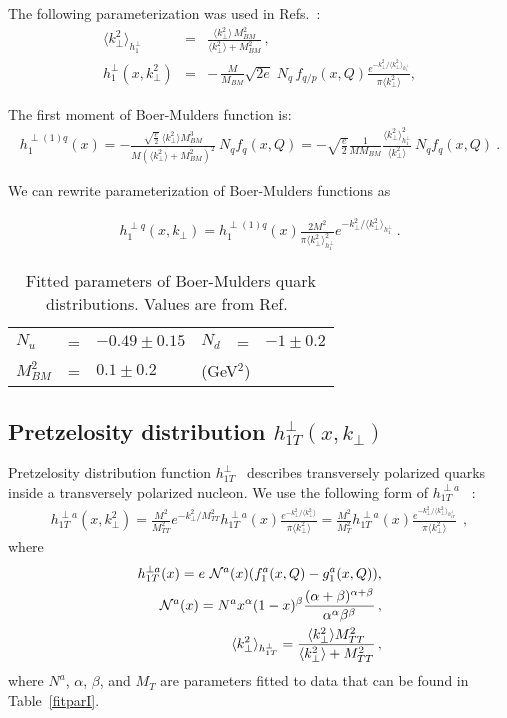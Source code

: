 \documentclass[a4paper,11pt]{article}
\newcommand{\ba}{\begin{eqnarray}}
\newcommand{\ea}{\end{eqnarray}}
\newcommand{\la}{\langle}
\newcommand{\ra}{\rangle}
\def\kperp{k_\perp}
\def\avkperp{\la \kperp^2 \ra}
\begin{document}
The following parameterization was used in Refs.~\cite{Barone:2015ksa}:
\ba
\avkperp_{h_1^\perp} &=& \frac{\avkperp \, M^2_{BM}}{\avkperp + M^2_{BM}} \, , \\
h_{1}^{\perp}(x, \kperp^2) &= &
- \,\frac{M}{M_{BM}}  
\sqrt{2e}\; N_q 
\, f_{q/p} (x, Q)\frac{e^{-\kperp^2/\avkperp_{h_{1}^{\perp}}}}{\pi\avkperp},  
\label{BM-dist}
\ea
 
The first moment of Boer-Mulders function is:
\ba
h_{1}^{\perp (1) q}(x)  = -\frac{\sqrt{\frac{e}{2}} \ \avkperp M_{BM}^3}{M (\avkperp + M_{BM}^2)^2}  \ {N}_q f_q(x, Q) = -\sqrt{\frac{e}{2}} \frac{1}{M M_{BM}}  \frac{\avkperp_{h_1^\perp}^2}{\avkperp}    \ {N}_q  f_q(x, Q)
\label{bm} \ .
\ea
 
We can rewrite parameterization of Boer-Mulders functions as

\ba
h_{1}^{\perp q}(x,\kperp) =  h_{1}^{\perp (1) q}(x)   \frac{2 M^2}{\pi \avkperp_{h_{1}^\perp}^2} e^{-\kperp^2/{\avkperp_{h_{1}^\perp}}}\label{bm_new} \ .
\ea
 
 
%
\begin{table}[htb]
\centering
\begin{tabular}{l c l l c l}
\hline
 $N_{u}$ &=& $-0.49 \pm 0.15$ & $N_{d}$ &=& $-1 \pm 0.2$\\
 $M_{BM}^2$ &=& $0.1 \pm  0.2$&\multicolumn{3}{l}{(GeV$^2$)}\\ 
\hline
\end{tabular}
\caption{Fitted parameters of Boer-Mulders quark distributions. Values are from Ref.~\cite{Barone:2015ksa}}
\label{fitparbm}
\end{table}
 
\subsection{\boldmath Pretzelosity distribution $h_{1T}^{\perp}(x,k_\perp)$}
\label{App:basis-h1Tperp}

Pretzelosity   distribution function   
$h_{1T}^{\perp}$~\cite{Lefky:2014eia} describes transversely polarized quarks 
inside a transversely polarized nucleon.
We use the following form of $h_{1T}^{\perp a}$ ~\cite{Lefky:2014eia}:
\ba
h_{1T}^{\perp a}(x,k_{\perp}^2) = \frac{M^2}{M_{TT}^2} e^{-\kperp^2/M_{TT}^2} h^{\perp a}_{1T}(x) \frac{e^{-{\kperp^2}/{\avkperp}}}{\pi \avkperp}=\frac{M^2}{M_T^2} h^{\perp a}_{1T}(x) \frac{e^{-{\kperp^2}/{\avkperp_{h_{1T}^\perp}}}}{\pi \avkperp}\,\;,
\label{eq:h1Tperp}
\ea
where
\ba
h^{\perp a}_{1T}(x) = e  \ {\cal N}^a(x) (f_{1}^{a}(x, Q) - g_{1}^{a}(x, Q)), \label{eq:hx_par}\\
{\cal N}^a(x) = N^{a} x^{\alpha} (1-x)^{\beta} \frac{(\alpha + \beta)^{\alpha + \beta}}{\alpha^{\alpha} \beta^{\beta}}\, ,  \\
\avkperp_{h_{1T}^\perp}  = \frac{\avkperp M_{TT}^2}{\avkperp + M_{TT}^2}\, ,
\ea
where ${N}^a$, $\alpha$, $\beta$, and $M_T$ are parameters fitted to data that can be found in Table~\ref{fitparI}.
\end{document}
